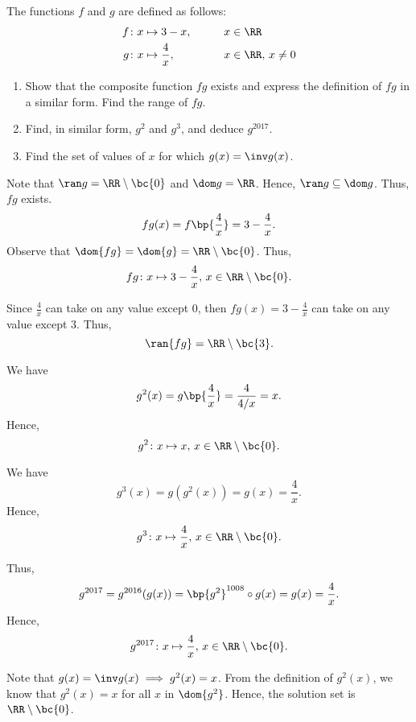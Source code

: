 \begin{problem}
    The functions $f$ and $g$ are defined as follows:
    \begin{alignat*}{2}
        f & \colon x \mapsto 3 - x, &&\qquad x \in \RR\\
        g & \colon x \mapsto \frac4{x}, &&\qquad x \in \RR, \, x \neq 0
    \end{alignat*}

    \begin{enumerate}
        \item Show that the composite function $fg$ exists and express the definition of $fg$ in a similar form. Find the range of $fg$.
        \item Find, in similar form, $g^2$ and $g^3$, and deduce $g^{2017}$.
        \item Find the set of values of $x$ for which $g(x) = \inv g(x)$.
    \end{enumerate}
\end{problem}
\begin{solution}
    \begin{ppart}
        Note that $\ran g = \RR \setminus \bc{0}$ and $\dom g = \RR$. Hence, $\ran g \subseteq \dom g$. Thus, $fg$ exists. \[fg(x) = f\bp{\frac4x} = 3 - \frac4x.\]  Observe that $\dom{fg} = \dom{g} = \RR\setminus \bc{0}$. Thus, \[fg \colon x \mapsto 3 - \frac4x, \, x \in \RR \setminus \bc{0}.\]
        
        Since $\frac4x$ can take on any value except 0, then $fg(x) = 3 - \frac4x$ can take on any value except 3. Thus, \[\ran{fg} = \RR \setminus \bc{3}.\]
    \end{ppart}
    \begin{ppart}
        We have \[g^2(x) = g\bp{\frac4x} = \frac4{4/x} = x.\] Hence, \[g^2 \colon x \mapsto x, \, x \in \RR \setminus \bc{0}.\]

        We have \[g^3(x) = g(g^2(x)) = g(x) = \frac4x.\] Hence, \[g^3 \colon x \mapsto \frac4x, \, x \in \RR \setminus \bc{0}.\]

        Thus, \[g^{2017} = g^{2016}(g(x)) = \bp{g^2}^{1008} \circ g(x) = g(x) = \frac4x.\] Hence, \[g^{2017} \colon x \mapsto \frac4x, \, x \in \RR \setminus \bc{0}.\]
    \end{ppart}
    \begin{ppart}
        Note that $g(x) = \inv g(x) \implies g^2(x) = x$. From the definition of $g^2(x)$, we know that $g^2(x) = x$ for all $x$ in $\dom{g^2}$. Hence, the solution set is $\RR \setminus \bc{0}$.
    \end{ppart}
\end{solution}

